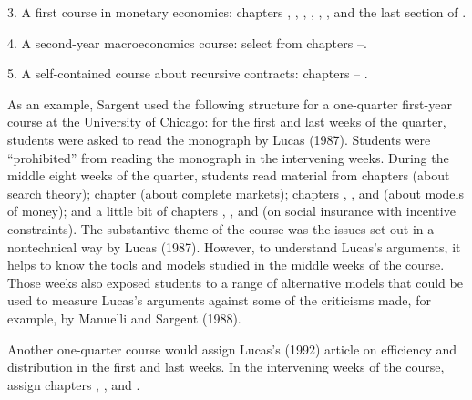 \medskip
 \item{3.}  A first course in
monetary economics:  chapters , , ,
,
, , and the last section of .
\medskip
\item{4.} A second-year macroeconomics course: select from
chapters --.
\medskip
\item{5.} A self-contained course about recursive contracts:
chapters
--%
. \medskip

As an example, Sargent used the following structure for
 a one-quarter first-year
course at the University of Chicago:   for the first and last
weeks of the quarter, students were asked  to read  the monograph
by Lucas (1987). Students were ``prohibited'' from reading the
monograph in the intervening weeks.   During    the middle eight
weeks of the quarter, students read material from   chapters
 (about search theory); chapter  (about complete markets);
chapters , , and
 (about models of money); and a little bit of
chapters
, , and 
(on social insurance with incentive constraints). The substantive
theme of the course was the issues set out in a nontechnical way
by Lucas (1987).
  However, to understand
Lucas's arguments, it helps to know the tools and models studied
in the middle weeks of the course.     Those weeks also exposed
students to a range of alternative models that could
be used to measure Lucas's arguments against some of the
criticisms   made, for example,  by Manuelli and Sargent (1988).
%

Another one-quarter course would  assign Lucas's  (1992) article
on efficiency and distribution in the first and last weeks. In the
intervening weeks of the course, assign chapters ,
, and .


